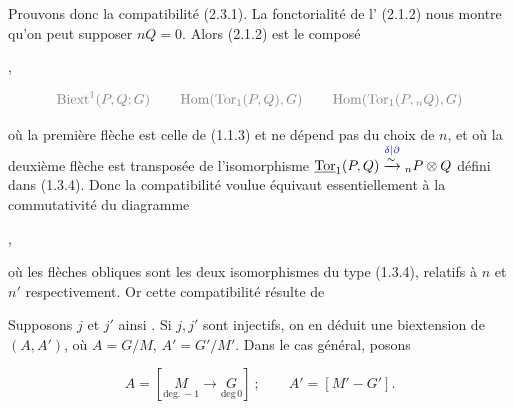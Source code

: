Prouvons donc la compatibilité (2.3.1). La fonctorialité de l' (2.1.2) nous montre qu'on peut supposer $nQ=0$. Alors (2.1.2) est le composé

,

\[
\deleted{\operatorname{Biext}^1(P,Q;G)\qquad\operatorname{Hom}(\operatorname{Tor}_1(P,Q),G)\qquad\operatorname{Hom}(\operatorname{Tor}_1(P,{}_nQ),G)}
\]

où la première flèche est celle de (1.1.3) et ne dépend pas du choix de $n$, et où la deuxième flèche est transposée de l'isomorphisme $\underline{\operatorname{Tor}}_1(P,Q)\overset{{\color{blue}\delta|\partial}}{\xrightarrow{\sim}}{}_nP\otimes Q$ défini dans (1.3.4). Donc la compatibilité voulue équivaut essentiellement à  la commutativité du diagramme

,

où les flèches obliques sont les deux isomorphismes du type (1.3.4), relatifs à $n$ et $n'$ respectivement. Or cette compatibilité résulte de



Supposons $j$ et $j'$ ainsi . Si $j,j'$ sont injectifs, on en déduit une biextension  de $(A,A')$, où $A=G/M$, $A'=G'/M'$. Dans le cas général, posons

\[
A=\left[\underset{\text{deg.}\,-1}{M}\longrightarrow\underset{\text{deg}\,0}{G}\right]\ ;\qquad
A'=\left[M'\mathbin{-}G'\right].
\]

